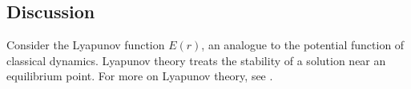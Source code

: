 \subsection{Discussion} Consider the Lyapunov function $E(r)$, an analogue to the potential function of classical dynamics. Lyapunov theory treats the stability of a solution near an equilibrium point. For more on Lyapunov theory, see \cite{}.

